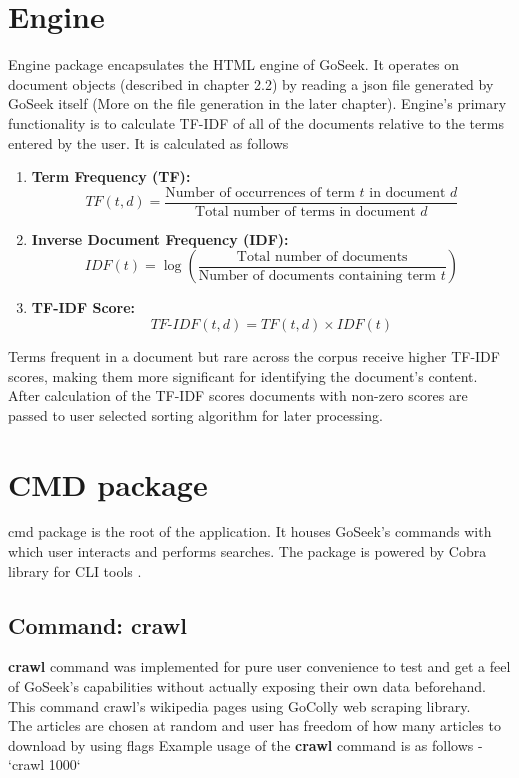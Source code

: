 \section{Engine}
    Engine package encapsulates the HTML engine of GoSeek. It operates on document objects (described in chapter 2.2) by reading a json file generated by GoSeek itself (More on the file generation in the later chapter). Engine's primary functionality is to calculate TF-IDF of all of the documents relative to the terms entered by the user. It is calculated as follows
    \begin{enumerate}
    \item \textbf{Term Frequency (TF):}
    \[
    TF(t, d) = \frac{\text{Number of occurrences of term } t \text{ in document } d}{\text{Total number of terms in document } d}
    \]

    \item \textbf{Inverse Document Frequency (IDF):}
    \[
    IDF(t) = \log\left(\frac{\text{Total number of documents}}{\text{Number of documents containing term } t}\right)
    \]

    \item \textbf{TF-IDF Score:}
    \[
    TF\text{-}IDF(t, d) = TF(t, d) \times IDF(t)
    \]
\end{enumerate}
Terms frequent in a document but rare across the corpus receive higher TF-IDF scores, making them more significant for identifying the document's content. \\
After calculation of the TF-IDF scores documents with non-zero scores are passed to user selected sorting algorithm for later processing.

\section{CMD package}
cmd package is the root of the application. It houses GoSeek's commands with which user interacts and performs searches. The package is powered by Cobra library for CLI tools \cite{cobra}.

\subsection{Command: crawl}
\textbf{crawl} command was implemented for pure user convenience to test and get a feel of GoSeek's capabilities without actually exposing their own data beforehand. This command crawl's wikipedia pages using GoColly web scraping library\cite{colly}. 
\\ The articles are chosen at random and user has freedom of how many articles to download by using flags
Example usage of the \textbf{crawl} command is as follows - `crawl 1000`
